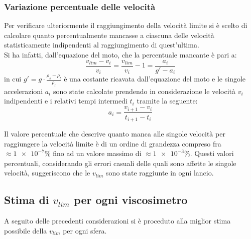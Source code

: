 \documentclass[a4paper,11pt,oneside]{article}
\begin{document}
\subsubsection*{Variazione percentuale delle velocità}
Per verificare ulteriormente il raggiungimento della velocità limite si è scelto di calcolare quanto percentualmente mancasse a ciascuna delle velocità statisticamente indipendenti al raggiungimento di quest'ultima.\\
Si ha infatti, dall'equazione del moto, che la percentuale mancante è pari a:
\begin{equation*}
    \frac{v_{lim} - v_{i}}{v_{i}}=\frac{v_{lim}}{v_i}-1=\frac{a_i}{g' - a_i}
\end{equation*}
in cui $g'=g\cdot\frac{\rho_s-\rho_l}{\rho_l}$ è una costante ricavata dall'equazione del moto e le singole accelerazioni $a_i$ sono state calcolate prendendo in considerazione le velocità $v_{i}$ indipendenti e i relativi tempi intermedi $t_{i}$ tramite la seguente:
\begin{equation*}
    a_i=\frac{v_{i+1}-v_i}{t_{i+1}-t_{i}}
\end{equation*}

Il valore percentuale che descrive quanto manca alle singole velocità per raggiungere la velocità limite è di un ordine di grandezza compreso fra $\approx\num{1e-7}\%$ fino ad un valore massimo di $\approx\num{1e-3}\%$. Questi valori percentuali, considerando gli errori casuali delle quali sono affette le singole velocità, suggeriscono che le $v_{lim}$ sono state raggiunte in ogni lancio. 


\subsection{Stima di $v_{lim}$ per ogni viscosimetro}
A seguito delle precedenti considerazioni si è proceduto alla miglior stima possibile della $v_{lim}$ per ogni sfera.
\end{document}

